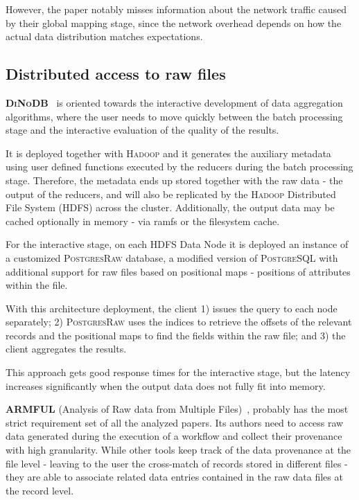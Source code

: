 However, the paper notably misses information about the network traffic caused 
by their global mapping stage, since the network overhead depends on how the 
actual data distribution matches \scidb expectations.


\subsection{Distributed access to raw files}
\textbf{\textsc{DiNoDB}}~\cite{Tian2014} is oriented towards the interactive development
of data aggregation algorithms, where the user needs to move quickly between 
the batch processing stage and the interactive evaluation of the quality of 
the results.

It is deployed together with \textsc{Hadoop} and it generates the auxiliary metadata 
using user defined functions executed by the reducers during the batch 
processing stage. Therefore, the metadata ends up stored together with the raw 
data - the output of the reducers, and will also be replicated by the \textsc{Hadoop} 
Distributed File System (\textsc{HDFS}) across the cluster. Additionally, the output 
data may be cached optionally in memory - via ramfs or the filesystem cache.

For the interactive stage, on each HDFS Data Node it is deployed an 
instance of a customized \textsc{PostgresRaw}\cite{Alagiannis2012Adaptive}
database, a modified version of \textsc{PostgreSQL} with additional support for 
raw files based on positional maps - positions of attributes within the file.

With this architecture deployment, the client 1) issues the query to each 
node separately; 2) \textsc{PostgresRaw} uses the indices to retrieve the offsets of the 
relevant records and the positional maps to find the fields within the 
raw file; and 3) the client aggregates the results.

This approach gets good response times for the interactive stage,
but the latency increases significantly when the output data does not 
fully fit into memory.

\medskip

\textbf{ARMFUL}  (Analysis of Raw data from Multiple Files)~\cite{Silva2017}, 
probably has the most strict requirement set of all the analyzed papers. Its 
authors need to access raw data generated during the execution of a 
workflow and collect their provenance with high granularity. While other 
tools keep track of the data provenance at the file level - leaving to the user 
the cross-match of records stored in different files - they are able to 
associate related data entries contained in the raw data files at the record 
level.

